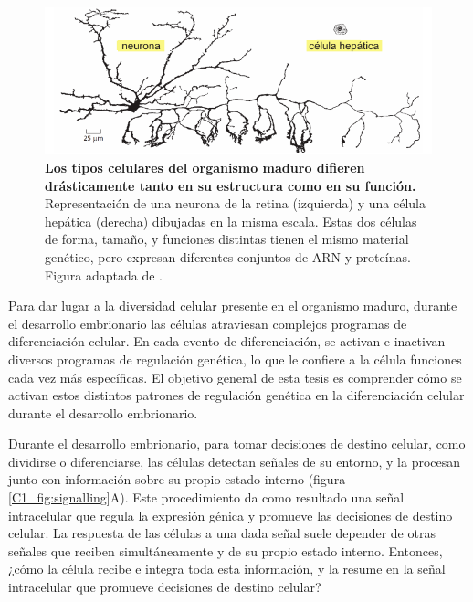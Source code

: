 \documentclass[./main.tex]{subfiles}
\begin{document}
 \begin{figure}
    \centering
    \includegraphics[width=1\columnwidth]{figures/chapter1/C1_cell_types.pdf}
    \caption{\textbf{Los tipos celulares del organismo maduro difieren drásticamente tanto en su estructura como en su función.} Representación de una neurona de la retina (izquierda) y una célula hepática (derecha) dibujadas en la misma escala. Estas dos células de forma, tamaño, y funciones distintas tienen el mismo material genético, pero expresan diferentes conjuntos de ARN y proteínas. Figura adaptada de \cite{Alberts2008}.}
    \label{C1_fig:cell_types}
\end{figure}

Para dar lugar a la diversidad celular presente en el organismo maduro, durante el desarrollo embrionario las células atraviesan complejos programas de diferenciación celular. En cada evento de diferenciación, se activan e inactivan diversos programas de regulación genética, lo que le confiere a la célula funciones cada vez más específicas. El objetivo general de esta tesis es comprender cómo se activan estos distintos patrones de regulación genética en la diferenciación celular durante el desarrollo embrionario. 


Durante el desarrollo embrionario, para tomar decisiones de destino celular, como dividirse o diferenciarse, las células detectan señales de su entorno, y la procesan junto con información sobre su propio estado interno (figura \ref{C1_fig:signalling}A). Este procedimiento da como resultado una señal intracelular que regula la expresión génica y promueve las decisiones de destino celular. La respuesta de las células a una dada señal suele depender de otras señales que reciben simultáneamente y de su propio estado interno. Entonces, ¿cómo la célula recibe e integra toda esta información, y la resume en la señal intracelular que promueve decisiones de destino celular?
\end{document}
